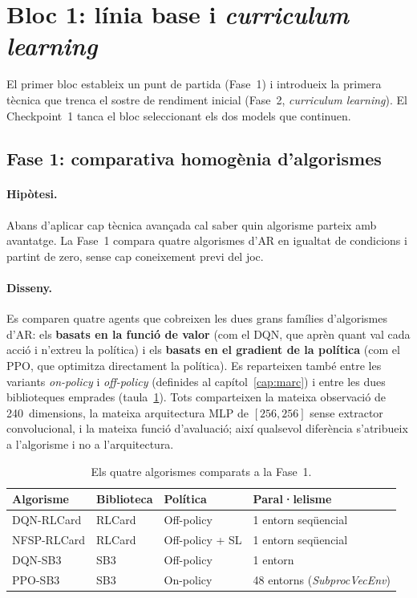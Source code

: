 ﻿%

\section{Bloc 1: línia base i \emph{curriculum learning}}
\label{sec:bloc1}

El primer bloc estableix un punt de partida (Fase~1) i introdueix la primera
tècnica que trenca el sostre de rendiment inicial (Fase~2, \emph{curriculum learning}).
El Checkpoint~1 tanca el bloc seleccionant els dos models que continuen.

\subsection{Fase 1: comparativa homogènia d'algorismes}
\label{sec:fase1}

\paragraph{Hipòtesi.} Abans d'aplicar cap tècnica avançada cal saber quin algorisme
parteix amb avantatge. La Fase~1 compara quatre algorismes d'\ac{AR} en igualtat de
condicions i partint de zero, sense cap coneixement previ del joc.

\paragraph{Disseny.} Es comparen quatre agents que cobreixen les dues grans famílies
d'algorismes d'\ac{AR}: els \textbf{basats en la funció de valor} (com el DQN, que aprèn
quant val cada acció i n'extreu la política) i els \textbf{basats en el gradient de la
política} (com el PPO, que optimitza directament la política). Es reparteixen també entre
les variants \emph{on-policy} i \emph{off-policy} (definides al capítol~\ref{cap:marc}) i
entre les dues biblioteques emprades (taula~\ref{tab:fase1-algorismes}). Tots comparteixen
la mateixa observació de
240~dimensions, la mateixa arquitectura \ac{MLP} de \([256, 256]\) sense extractor
convolucional, i la mateixa funció d'avaluació; així qualsevol diferència s'atribueix a
l'algorisme i no a l'arquitectura.

\begin{table}[H]
  \centering
  \begin{tabular}{llll}
    \toprule
    Algorisme & Biblioteca & Política & Paral·lelisme \\
    \midrule
    DQN-RLCard  & RLCard & Off-policy        & 1 entorn seqüencial \\
    NFSP-RLCard & RLCard & Off-policy + \acs{SL} & 1 entorn seqüencial \\
    DQN-SB3     & \ac{SB3} & Off-policy      & 1 entorn \\
    PPO-SB3     & \ac{SB3} & On-policy       & 48 entorns (\emph{SubprocVecEnv}) \\
    \bottomrule
  \end{tabular}
  \caption{Els quatre algorismes comparats a la Fase~1.}
  \label{tab:fase1-algorismes}
\end{table}

